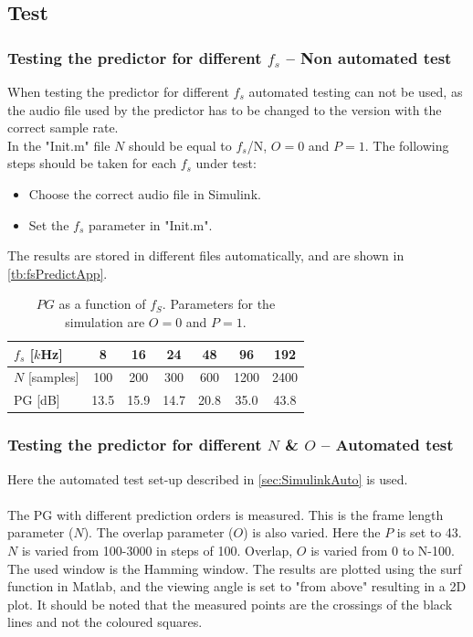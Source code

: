 \subsection{Test}

\subsubsection{Testing the predictor for different $f_s$ -- Non automated test}
When testing the predictor for different $f_s$ automated testing can not be used, as the audio file used by the predictor has to be changed to the version with the correct sample rate. \\ 
In the "Init.m" file $N$ should be equal to $f_s$/N, $O=0$ and $P=1$. The following steps should be taken for each $f_s$ under test:
\begin{itemize}
	\item Choose the correct audio file in Simulink. 
	\item Set the $f_s$ parameter in "Init.m". 
\end{itemize}
The results are stored in different files automatically, and are shown in \autoref{tb:fsPredictApp}.

\begin{table}[H]
\centering
\begin{tabular}{|l|c|c|c|c|c|c|}
	\hline
	$f_s$ {[}$k$Hz{]} & 8 & 16 & 24 & 48 & 96 & 192 \\ \hline 
	$N$ {[}samples{]} & 100 & 200 & 300 & 600 & 1200 & 2400 \\ \hline 
	PG {[}dB{]} & 13.5 & 15.9 & 14.7 & 20.8 & 35.0 & 43.8 \\ \hline
\end{tabular}
\caption{$PG$ as a function of $f_S$. Parameters for the simulation are $O=0$ and $P=1$.}
\label{tb:fsPredictApp}
\end{table}  
 
\subsubsection{Testing the predictor for different $N$ \& $O$ -- Automated test}
Here the automated test set-up described in \autoref{sec:SimulinkAuto} is used.\\\\ 
The PG with different prediction orders is measured. This is the frame length parameter ($N$). The overlap parameter ($O$) is also varied. 
Here the $P$ is set to 43. $N$ is varied from 100-3000 in steps of 100. Overlap, $O$ is varied from 0 to N-100. The used window is the Hamming window. The results are plotted using the surf function in Matlab, and the viewing angle is set to "from above" resulting in a 2D plot. It should be noted that the measured points are the crossings of the black lines and not the coloured squares. %

